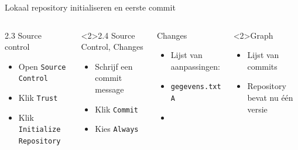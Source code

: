 \documentclass
[kulak,outline] %
{kulakbeamer}
\begin{document}
	\begin{frame}{Lokaal repository initialiseren en eerste commit}
		\begin{columns}[T]
		
			\begin{block}{2.3 Source control}
				\begin{itemize}
					\item Open \texttt{Source Control}
					\item Klik \texttt{Trust}
					\item Klik \texttt{Initialize Repository}
				\end{itemize}
			\end{block}

			\begin{block}<2>{2.4 Source Control, Changes}
				\begin{itemize}
					\item Schrijf een commit message
					\item Klik \texttt{Commit}
					\item Kies \texttt{Always}
				\end{itemize}
			\end{block}
	
			\begin{exampleblock}{Changes}
				\begin{itemize}
					\item Lijst van aanpassingen:
					\item \texttt{gegevens.txt A}
					\item[]
				\end{itemize}
			\end{exampleblock}

			\begin{exampleblock}<2>{Graph}
			\begin{itemize}
				\item Lijst van commits
				\item Repository bevat nu één versie
			\end{itemize}
		\end{exampleblock}
		\end{columns}
	\end{frame}
\end{document}
